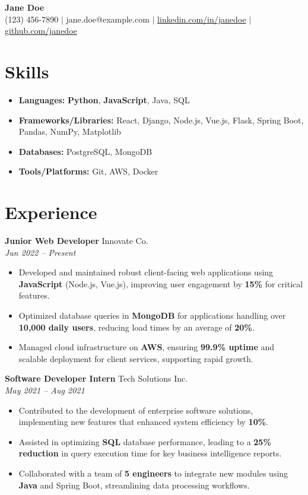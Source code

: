 \documentclass{article}
\newcommand{\resheading}[1]{\section*{#1}\vspace{-1.5em}}
\newcommand{\ressubheading}[1]{\textbf{#1}} %
\newcommand{\personalinfo}[5]{%
    \begin{center}
        \textbf{\Large #1}\\[5pt]
        #2 $|$ #3 $|$ \href{https://#4}{#4} $|$ \href{https://#5}{#5}
    \end{center}
    \vspace{-1.5em} %
}
\begin{document}
\personalinfo{Jane Doe}{(123) 456-7890}{jane.doe@example.com}{linkedin.com/in/janedoe}{github.com/janedoe}

\resheading{Skills}
\begin{itemize}
    \item \textbf{Languages:} \textbf{Python}, \textbf{JavaScript}, Java, SQL
    \item \textbf{Frameworks/Libraries:} React, Django, Node.js, Vue.js, Flask, Spring Boot, Pandas, NumPy, Matplotlib
    \item \textbf{Databases:} PostgreSQL, MongoDB
    \item \textbf{Tools/Platforms:} Git, AWS, Docker
\end{itemize}

\resheading{Experience}
\ressubheading{Junior Web Developer} \hfill Innovate Co. \\
\textit{Jun 2022 – Present}
\begin{itemize}
    \item Developed and maintained robust client-facing web applications using \textbf{JavaScript} (Node.js, Vue.js), improving user engagement by \textbf{15\%} for critical features.
    \item Optimized database queries in \textbf{MongoDB} for applications handling over \textbf{10,000 daily users}, reducing load times by an average of \textbf{20\%}.
    \item Managed cloud infrastructure on \textbf{AWS}, ensuring \textbf{99.9\% uptime} and scalable deployment for client services, supporting rapid growth.
\end{itemize}

\vspace{0.5em} %

\ressubheading{Software Developer Intern} \hfill Tech Solutions Inc. \\
\textit{May 2021 – Aug 2021}
\begin{itemize}
    \item Contributed to the development of enterprise software solutions, implementing new features that enhanced system efficiency by \textbf{10\%}.
    \item Assisted in optimizing \textbf{SQL} database performance, leading to a \textbf{25\% reduction} in query execution time for key business intelligence reports.
    \item Collaborated with a team of \textbf{5 engineers} to integrate new modules using \textbf{Java} and Spring Boot, streamlining data processing workflows.
\end{itemize}
\end{document}
